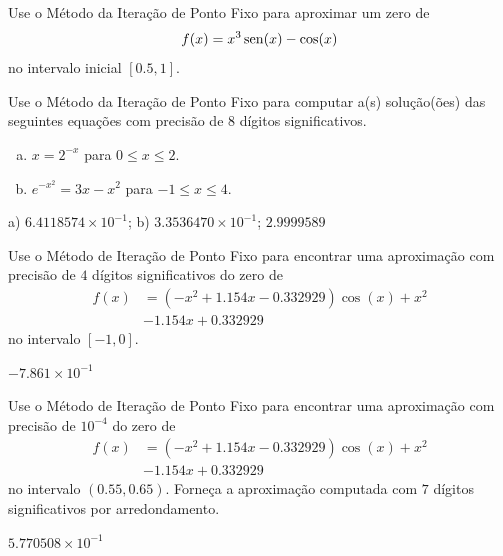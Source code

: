 \begin{exer}
  Use o Método da Iteração de Ponto Fixo para aproximar um zero de
  \begin{equation}
    f(x)=x^3\operatorname{sen}(x)-\cos(x)
  \end{equation}
  no intervalo inicial $[0.5, 1]$.
\end{exer}

\begin{exer}
  Use o Método da Iteração de Ponto Fixo para computar a(s) solução(ões) das seguintes equações com precisão de 8 dígitos significativos.
  \begin{enumerate}[a)]
  \item $x = 2^{-x}$ para $0\leq x \leq 2$.
  \item $e^{-x^2} = 3x - x^2$ para $-1\leq x\leq 4$.
  \end{enumerate}
\end{exer}
\begin{resp}
  a) $6.4118574\times 10^{-1}$; b) $3.3536470\times 10^{-1}$; $2.9999589$
\end{resp}

\begin{exer}
  Use o Método de Iteração de Ponto Fixo para encontrar uma aproximação com precisão de $4$ dígitos significativos do zero de 
  \begin{equation}
    \begin{aligned}
      f(x) &= (-x^2+1.154x-0.332929)\cos(x) + x^2 \\
      &- 1.154x + 0.332929
  \end{aligned}
  \end{equation}
  no intervalo $[-1, 0]$.
\end{exer}
\begin{resp}
  $-7.861\times 10^{-1}$
\end{resp}

\begin{exer}
  Use o Método de Iteração de Ponto Fixo para encontrar uma aproximação com precisão de $10^{-4}$ do zero de
  \begin{equation}
    \begin{aligned}
      f(x) &= (-x^2+1.154x-0.332929)\cos(x) + x^2\\
      &- 1.154x + 0.332929
  \end{aligned}
  \end{equation}
no intervalo $(0.55, 0.65)$. Forneça a aproximação computada com $7$ dígitos significativos por arredondamento.
\end{exer}
\begin{resp}
  $5.770508\times 10^{-1}$
\end{resp}

